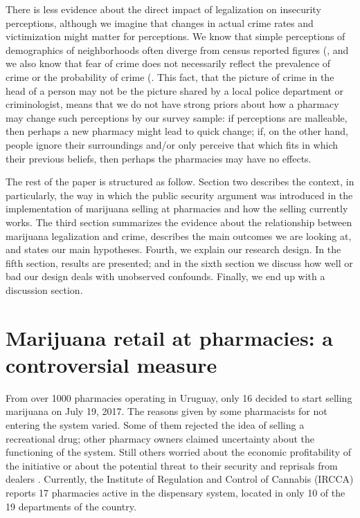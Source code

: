 \documentclass[11pt]{article}
\begin{document}
There is less evidence about the direct impact of legalization on insecurity perceptions, although we imagine that changes in actual crime rates and victimization might matter for perceptions. We know that simple perceptions of demographics of neighborhoods often diverge from census reported figures (\citep{wong2012bringing}, and we also know that fear of crime does not necessarily reflect the prevalence of crime or the probability of crime (\citep{wong2012bringing}. This fact, that the picture of crime in the head of a person may not be the picture shared by a local police department or criminologist, means that we do not have strong priors about how a pharmacy may change such perceptions by our survey sample: if perceptions are malleable, then perhaps a new pharmacy might lead to quick change; if, on the other hand, people ignore their surroundings and/or only perceive that which fits in which their previous beliefs, then perhaps the pharmacies may have no effects.

The rest of the paper is structured as follow. Section two describes the context, in particularly, the way in which the public security argument was introduced in the implementation of marijuana selling at pharmacies and how the selling currently works. The third section summarizes the evidence about the relationship between marijuana legalization and crime, describes the main outcomes we are looking at,  and states our main hypotheses. Fourth, we explain our research design. In the fifth section, results are presented; and in the sixth section we discuss how well or bad our design deals with unobserved confounds. Finally, we end up with a discussion section.

\section{Marijuana retail at pharmacies: a controversial measure}

From over 1000 pharmacies operating in Uruguay, only 16 decided to start selling marijuana on July 19, 2017. The reasons given by some pharmacists for not entering the system varied. Some of them rejected the idea of selling a recreational drug; other pharmacy owners claimed uncertainty about the functioning of the system. Still others worried about the economic profitability of the initiative or about the potential threat to their security and reprisals from dealers \citep{boidi2016}. Currently, the Institute of Regulation and Control of Cannabis (IRCCA) reports 17 pharmacies active in the dispensary system, located in only 10 of the 19 departments of the country.
\end{document}
